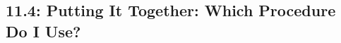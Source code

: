 \documentclass{report}
\begin{document}
    \subsection*{11.4: Putting It Together: Which Procedure Do I Use?}
    \bigbreak \noindent 
\begin{figure}[ht]
    \centering
    \label{fig:taketwo}
\end{figure}







    
\end{document}
